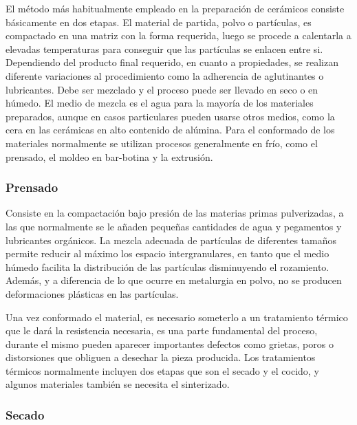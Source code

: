 \documentclass[a4paper, 11pt]{article}
\begin{document}
El método más habitualmente empleado en la preparación de cerámicos consiste básicamente en dos etapas. El material de partida, polvo o partículas, es compactado en una matriz con la forma requerida, luego se procede a calentarla a elevadas temperaturas para conseguir que las partículas se enlacen entre si. Dependiendo del producto final requerido, en cuanto a propiedades, se realizan diferente variaciones al procedimiento como la adherencia de aglutinantes o lubricantes. Debe ser mezclado y el proceso puede ser llevado en seco o en húmedo. El medio de mezcla es el agua para la mayoría de los materiales preparados, aunque en casos particulares pueden usarse otros medios, como la cera en las cerámicas en alto contenido de alúmina. Para el conformado de los materiales normalmente se utilizan procesos generalmente en frío, como el prensado, el moldeo en bar-botina y la extrusión.\cite{cera}  

\subsubsection{Prensado}

Consiste en la compactación bajo presión de las materias primas pulverizadas, a las que normalmente se le añaden pequeñas cantidades de agua y pegamentos y lubricantes orgánicos. La mezcla adecuada de partículas de diferentes tamaños permite reducir al máximo los espacio intergranulares, en tanto que el medio húmedo facilita la distribución de las partículas disminuyendo el rozamiento. Además, y a diferencia de lo que ocurre en metalurgia en polvo, no se producen deformaciones plásticas en las partículas.   

Una vez conformado el material, es necesario someterlo a un tratamiento térmico que le dará la resistencia necesaria, es una parte fundamental del proceso, durante el mismo pueden aparecer importantes defectos como grietas, poros o distorsiones que obliguen a desechar la pieza producida. Los tratamientos térmicos normalmente incluyen dos etapas que son el secado y el cocido, y algunos materiales también se necesita el sinterizado.

\subsubsection{Secado}
\end{document}
